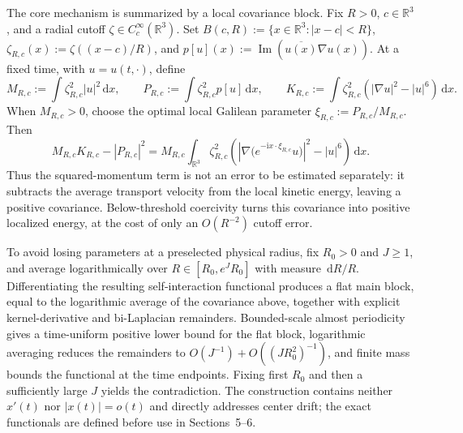 \documentclass{interact}
\numberwithin{equation}{section}
\theoremstyle{plain}
\theoremstyle{definition}
\theoremstyle{remark}
\newcommand{\R}{\mathbb R}
\newcommand{\ii}{\mathrm i}
\newcommand{\Ima}{\operatorname{Im}}
\newcommand{\dd}{\,\mathrm d}
\begin{document}
The core mechanism is summarized by a local covariance block. Fix $R>0$, $c\in\R^3$, and a radial cutoff $\zeta\in C_c^\infty(\R^3)$. Set $B(c,R):=\{x\in\R^3:|x-c|<R\}$, $\zeta_{R,c}(x):=\zeta((x-c)/R)$, and $p[u](x):=\Ima(\overline{u(x)}\nabla u(x))$. At a fixed time, with $u=u(t,\cdot)$, define
\[
 M_{R,c}:=\int\zeta_{R,c}^2|u|^2\dd x,\qquad
 P_{R,c}:=\int\zeta_{R,c}^2p[u]\dd x,\qquad
 K_{R,c}:=\int\zeta_{R,c}^2(|\nabla u|^2-|u|^6)\dd x.
\]
When $M_{R,c}>0$, choose the optimal local Galilean parameter $\xi_{R,c}:=P_{R,c}/M_{R,c}$. Then
\[
 M_{R,c}K_{R,c}-|P_{R,c}|^2
 =M_{R,c}\int_{\R^3}\zeta_{R,c}^2
 \left(\left|\nabla\bigl(e^{-\ii x\cdot\xi_{R,c}}u\bigr)\right|^2-|u|^6\right)\dd x.
\]
Thus the squared-momentum term is not an error to be estimated separately: it subtracts the average transport velocity from the local kinetic energy, leaving a positive covariance. Below-threshold coercivity turns this covariance into positive localized energy, at the cost of only an $O(R^{-2})$ cutoff error.

To avoid losing parameters at a preselected physical radius, fix $R_0>0$ and $J\ge1$, and average logarithmically over $R\in[R_0,e^JR_0]$ with measure $\dd R/R$. Differentiating the resulting self-interaction functional produces a flat main block, equal to the logarithmic average of the covariance above, together with explicit kernel-derivative and bi-Laplacian remainders. Bounded-scale almost periodicity gives a time-uniform positive lower bound for the flat block, logarithmic averaging reduces the remainders to $O(J^{-1})+O((JR_0^2)^{-1})$, and finite mass bounds the functional at the time endpoints. Fixing first $R_0$ and then a sufficiently large $J$ yields the contradiction. The construction contains neither $x'(t)$ nor $|x(t)|=o(t)$ and directly addresses center drift; the exact functionals are defined before use in Sections~5--6.
\end{document}
